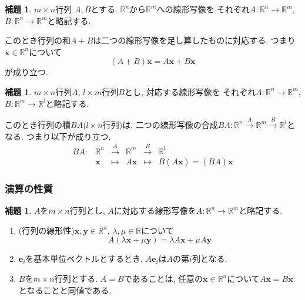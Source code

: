 \documentclass[dvipdfmx,a4paper,11pt]{article}
\newcommand{\R}{\mathbb{R}}
\theoremstyle{definition}
\newtheorem{lem}[thm]{補題}
\begin{document}
 
  \begin{tcolorbox}[
    colback = white,
    colframe = green!35!black,
    fonttitle = \bfseries,
    breakable = true]
    \begin{lem}
   $m \times n$行列
$A, B$とする. $\R^n$から$\R^m$への線形写像を
それぞれ$A: \R^n \to \R^m$, $B: \R^n \to \R^m$と略記する.

このとき行列の和$A+B$は二つの線形写像を足し算したものに対応する.
 つまり$\bm{x}\in \R^n$について
 $$
 (A+B)\bm{x}=A\bm{x} + B\bm{x}
 $$
が成り立つ. 
\end{lem}
 \end{tcolorbox}
 
  \begin{tcolorbox}[
    colback = white,
    colframe = green!35!black,
    fonttitle = \bfseries,
    breakable = true]
    \begin{lem}
    \label{lem-compo}
$m \times n$行列$A$, $l \times m$行列$B$とし, 対応する線形写像を
それぞれ$A: \R^n \to \R^m$, $B: \R^m\to \R^l$と略記する.

このとき行列の積$BA$($l \times n$行列)は, 二つの線形写像の合成$BA: \R^n \overset{A}{\rightarrow} \R^m \overset{B}{\rightarrow} \R^l$となる. 
つまり以下が成り立つ. 
$$
\begin{array}{cccccc}
BA:&\R^n& \overset{A}{\rightarrow} & \R^m&\overset{B}{\rightarrow}& \R^l\\
&\bm{x} & \longmapsto & A\bm{x}&\longmapsto & B(A\bm{x}) = (BA)\bm{x}
\end{array}
$$
\end{lem}
 \end{tcolorbox}
 
 \subsubsection{演算の性質}
 
 
  \begin{tcolorbox}[
    colback = white,
    colframe = green!35!black,
    fonttitle = \bfseries,
    breakable = true]
    \begin{lem}\cite[補題2.1, 2.2]{M}
    \label{lem-2.1}
$A$を$m \times n$行列とし, $A$に対応する線形写像を$A: \R^n \to \R^m$と略記する.
\begin{enumerate}
	\setlength{\parskip}{0cm}
  	\setlength{\itemsep}{0pt} 
\item (行列の線形性)$\bm{x}, \bm{y} \in \R^n$, $\lambda, \mu \in \R$について
$$
A(\lambda\bm{x} + \mu \bm{y})
=
\lambda A\bm{x}
+\mu A \bm{y}
$$
\item $\bm{e}_i$を基本単位ベクトルとするとき, $A\bm{e}_i$は$A$の第$i$列となる.
\item $B$を$m \times n$行列とする. $A=B$であることは, 任意の$\bm{x} \in \R^n$について$A\bm{x}=B\bm{x}$となることと同値である. 
\end{enumerate}
\end{lem}
 \end{tcolorbox}
 
\end{document}
